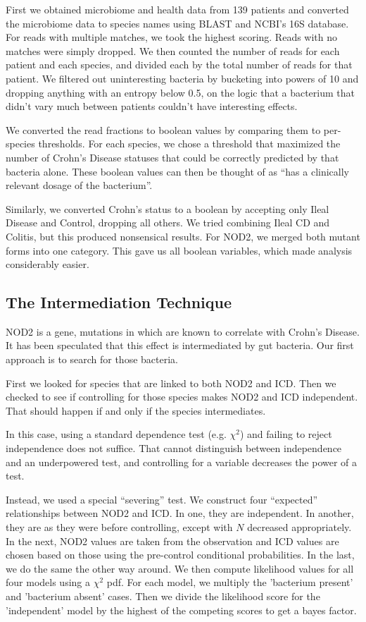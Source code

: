 \documentclass[a4paper]{article}
\begin{document}
First we obtained microbiome and health data from 139 patients\cite{data} and
converted the microbiome data to species names using BLAST and NCBI's
16S database.  For reads with multiple matches, we took the highest
scoring.  Reads with no matches were simply dropped.  We then counted
the number of reads for each patient and each species, and divided
each by the total number of reads for that patient.  We filtered out
uninteresting bacteria by bucketing into powers of 10 and dropping
anything with an entropy below 0.5, on the logic that a bacterium that
didn't vary much between patients couldn't have interesting effects.

We converted the read fractions to boolean values by comparing them to
per-species thresholds.  For each species, we chose a threshold that
maximized the number of Crohn's Disease statuses that could be
correctly predicted by that bacteria alone.  These boolean values can
then be thought of as ``has a clinically relevant dosage of the
bacterium''.

Similarly, we converted Crohn's status to a boolean by accepting only
Ileal Disease and Control, dropping all others.  We tried combining
Ileal CD and Colitis, but this produced nonsensical results.  For
NOD2, we merged both mutant forms into one category.  This gave us all
boolean variables, which made analysis considerably easier.

\subsection{The Intermediation Technique}

NOD2 is a gene, mutations in which are known\cite{data} to correlate with
Crohn's Disease.  It has been speculated that this effect is
intermediated by gut bacteria.  Our first approach is to search for
those bacteria.

First we looked for species that are linked to both NOD2 and ICD.
Then we checked to see if controlling for those species makes NOD2 and
ICD independent.  That should happen if and only if the species
intermediates.

In this case, using a standard dependence test (e.g. $\chi^2$) and
failing to reject independence does not suffice.  That cannot
distinguish between independence and an underpowered test, and
controlling for a variable decreases the power of a test.  

Instead, we used a special ``severing'' test.  We construct four
``expected'' relationships between NOD2 and ICD.  In one, they are
independent.  In another, they are as they were before controlling,
except with $N$ decreased appropriately.  In the next, NOD2 values are
taken from the observation and ICD values are chosen based on those
using the pre-control conditional probabilities.  In the last, we do
the same the other way around.  We then compute likelihood values for
all four models using a $\chi^2$ pdf.  For each model, we multiply the
'bacterium present' and 'bacterium absent' cases.  Then we divide the
likelihood score for the 'independent' model by the highest of the
competing scores to get a bayes factor.
\end{document}
